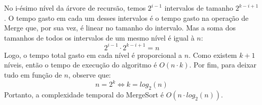 No i-ésimo nível da árvore de recursão, temos $2^{i-1}$ intervalos de tamanho $2^{k-i+1}$. O tempo gasto em cada um desses intervalos é o tempo gasto na operação de Merge que, por sua vez, é linear no tamanho do intervalo. Mas a soma dos tamanhos de todos os intervalos de um mesmo nível é igual à $n$:
\[
    2^{i-1} \cdot 2^{k-i+1} = n
\]
Logo, o tempo total gasto em cada nível é proporcional a $n$. Como existem $k+1$ níveis, então o tempo de execução do algoritmo é $O(n\cdot k)$. Por fim, para deixar tudo em função de $n$, observe que:
\[
    n = 2^k \Leftrightarrow k = log_2(n)
\]
Portanto, a complexidade temporal do MergeSort é $O(n\cdot log_2(n))$.